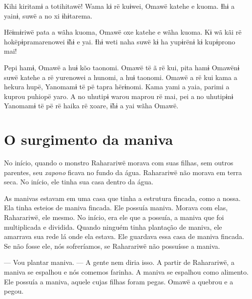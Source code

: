 
Kihi kiritamɨ a totihitawë! Wama kɨ rë kuɨwei, Omawë katehe e kuoma. Ɨhɨ
a yainɨ, suwë a no xi ɨhɨtarema. 

Hëɨmɨriwë pata a wãha kuoma, Omawë oxe katehe e wãha kuoma. Kɨ wã kãi rë
hokëpɨpramarenowei ɨ̃hɨ e yai. Ɨhɨ weti naha suwë kɨ ha yupɨrënɨ kɨ
kupɨprono mai! 


Pepi hamɨ, Omawë a huɨ kõo taonomi. Omawë të ã rë kui, pita hamɨ Omawënɨ
suwë katehe a rë yurenowei a hunomi, a huɨ taonomi. Omawë a rë kui kama
a hekura hupë, Yanomamɨ të pë tapra hërɨnomi. Kama yami a yaia, parimi a
kuprou puhiopë yaro. A no uhutipɨ warou maprou rë mai, pei a no
uhutipɨnɨ Yanomamɨ të pë rë haika rë xoare, ɨ̃hɨ a yai wãha Omawë. 

\chapter{O surgimento da maniva}
 
  

No início, quando o monstro Raharariwë morava com suas filhas, sem outros
parentes, seu \textit{xapono} ficava no fundo da água. Raharariwë não morava em
terra seca. No início, ele tinha sua casa dentro da água. 

As manivas estavam em uma casa que tinha a estrutura fincada, como a
nossa. Ela tinha esteios de maniva fincada. Ele possuía maniva. Morava
com elas, Raharariwë, ele mesmo. No início, era ele que a possuía, a
maniva que foi multiplicada e dividida. Quando ninguém tinha plantação
de maniva, ele amarrava sua rede lá onde ela estava. Ele guardava essa casa
de maniva fincada. Se não fosse ele, nós sofreríamos, se Raharariwë não
possuísse a maniva. 

--- Vou plantar maniva. --- A gente nem diria isso. A partir de
Raharariwë, a maniva se espalhou e nós comemos farinha. A maniva se
espalhou como alimento. Ele possuía a maniva, aquele cujas filhas foram
pegas. Omawë a quebrou e a pegou.

